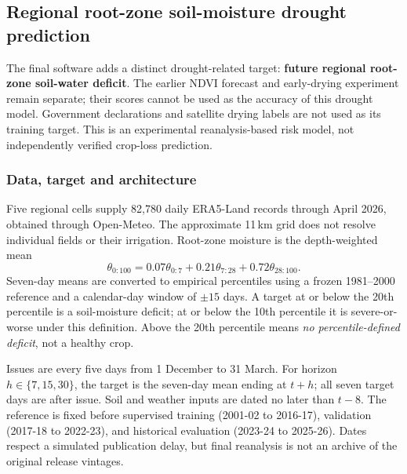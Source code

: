\subsection{Regional root-zone soil-moisture drought prediction}
\label{sec:rabi_soil}
The final software adds a distinct drought-related target: \textbf{future regional root-zone soil-water deficit}. The earlier NDVI forecast and early-drying experiment remain separate; their scores cannot be used as the accuracy of this drought model. Government declarations and satellite drying labels are not used as its training target. This is an experimental reanalysis-based risk model, not independently verified crop-loss prediction.

\subsubsection{Data, target and architecture}
Five regional cells supply 82,780 daily ERA5-Land records through April 2026, obtained through Open-Meteo. The approximate 11\,km grid does not resolve individual fields or their irrigation. Root-zone moisture is the depth-weighted mean
\[
\theta_{0:100}=0.07\theta_{0:7}+0.21\theta_{7:28}+0.72\theta_{28:100}.
\]
Seven-day means are converted to empirical percentiles using a frozen 1981--2000 reference and a calendar-day window of $\pm15$ days. A target at or below the 20th percentile is a soil-moisture deficit; at or below the 10th percentile it is severe-or-worse under this definition. Above the 20th percentile means \emph{no percentile-defined deficit}, not a healthy crop.

Issues are every five days from 1 December to 31 March. For horizon $h\in\{7,15,30\}$, the target is the seven-day mean ending at $t+h$; all seven target days are after issue. Soil and weather inputs are dated no later than $t-8$. The reference is fixed before supervised training (2001-02 to 2016-17), validation (2017-18 to 2022-23), and historical evaluation (2023-24 to 2025-26). Dates respect a simulated publication delay, but final reanalysis is not an archive of the original release vintages.

